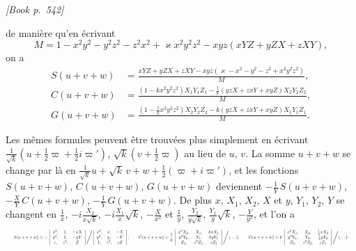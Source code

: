 \documentclass[11pt]{article}
\begin{document}
\medskip
\noindent\textit{[Book p.~542]}\hfill

\smallskip

\noindent de mani\`ere qu'en \'ecrivant
\[
M = 1 - x^{2}y^{2} - y^{2}z^{2} - z^{2}x^{2} + \varkappa x^{2}y^{2}z^{2} - xyz(xYZ + yZX + zXY),
\]
on a
\[
\begin{aligned}
S(u + v + w) &= \frac{xYZ + yZX + zXY - xyz(\varkappa - x^{2} - y^{2} - z^{2} + x^{2}y^{2}z^{2})}{M},\\
C(u + v + w) &= \frac{(1 - kx^{2}y^{2}z^{2})X_{1}Y_{1}Z_{1} - \tfrac{1}{k}(yzX + zxY + xyZ)X_{2}Y_{2}Z_{2}}{M},\\
G(u + v + w) &= \frac{(1 - \tfrac{1}{k}x^{2}y^{2}z^{2})X_{2}Y_{2}Z_{2} - k(yzX + zxY + xyZ)X_{1}Y_{1}Z_{1}}{M}.
\end{aligned}
\]

Les m\^emes formules peuvent \^etre trouv\'ees plus simplement en \'ecrivant $\tfrac{1}{\sqrt{k}}(u + \tfrac{1}{2}\varpi + \tfrac{1}{2}i\varpi')$, $\sqrt{k}(v + \tfrac{1}{2}\varpi)$ au lieu de $u$, $v$. La somme $u + v + w$ se change par l\`a en $\tfrac{1}{\sqrt{k}}u + \sqrt{k}\,v + w + \tfrac{1}{2}(\varpi + i\varpi')$, et les fonctions $S(u + v + w)$, $C(u + v + w)$, $G(u + v + w)$ deviennent $-\tfrac{1}{Y}\,S(u + v + w)$, $-\tfrac{X}{Y}\,C(u + v + w)$, $-\tfrac{1}{Y}\,G(u + v + w)$. De plus $x$, $X_{1}$, $X_{2}$, $X$ et $y$, $Y_{1}$, $Y_{2}$, $Y$ se changent en $\tfrac{1}{x}$, $-i\tfrac{X_{2}}{x\sqrt{k}}$, $-i\tfrac{X_{1}}{x}\sqrt{k}$, $-\tfrac{X}{x^{2}}$ et $\tfrac{1}{y}$, $\tfrac{Y_{2}}{y\sqrt{k}}$, $\tfrac{Y_{1}}{y}\sqrt{k}$, $-\tfrac{Y}{y^{2}}$, et l'on a
\[ \resizebox{\textwidth}{!}{$\displaystyle
S(u + v + w) = -\,\left|\begin{array}{ccc}x^{2}, & 1, & -xX\\ y^{2}, & 1, & -yY\\ z, & z^{2}, & Z\end{array}\right|\Bigg/\left|\begin{array}{ccc}x^{2}, & x, & -X\\ y^{2}, & y, & -Y\\ 1, & z^{2}, & zZ\end{array}\right|,\qquad C(u+v+w) = \frac{1}{k}\,\left|\begin{array}{ccc}x^{2}X_{2}, & X_{1}, & kxX_{1}\\ y^{2}Y_{2}, & Y_{1}, & kyY_{1}\\ Z_{1}, & z^{2}Z_{1}, & zZ_{2}\end{array}\right|\Bigg/(\dots),\qquad G(u+v+w) = k\,\left|\begin{array}{ccc}x^{2}X_{1}, & X_{2}, & \tfrac{1}{k}xX_{2}\\ y^{2}Y_{1}, & Y_{2}, & \tfrac{1}{k}yY_{2}\\ Z_{2}, & z^{2}Z_{2}, & zZ_{1}\end{array}\right|\Bigg/(\dots).
$} \]
\end{document}
